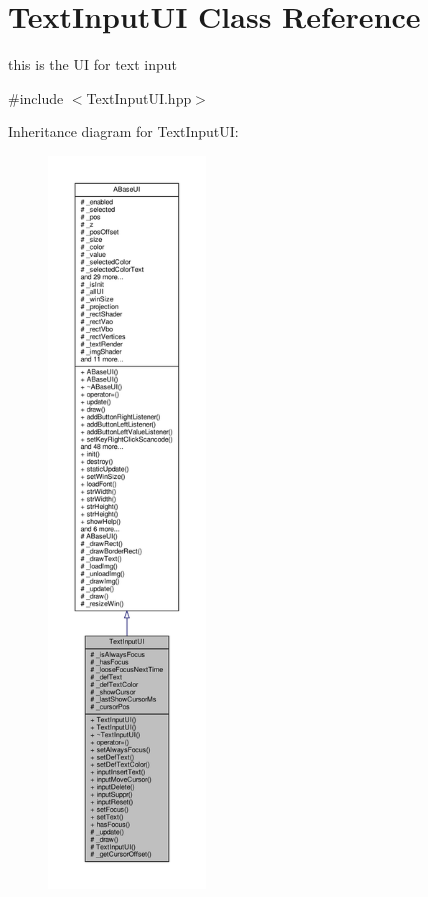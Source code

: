 \hypertarget{class_text_input_u_i}{}\section{Text\+Input\+UI Class Reference}
\label{class_text_input_u_i}


this is the UI for text input  




{\ttfamily \#include $<$Text\+Input\+U\+I.\+hpp$>$}



Inheritance diagram for Text\+Input\+UI\+:
\nopagebreak
\begin{figure}[H]
\begin{center}
\leavevmode
\includegraphics[height=550pt]{class_text_input_u_i__inherit__graph}
\end{center}
\end{figure}


